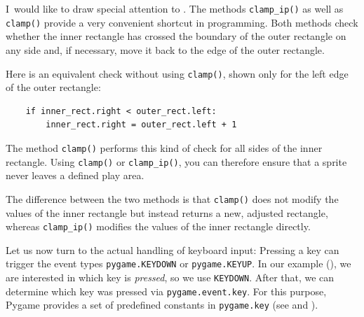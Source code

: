 I~would like to draw special attention to . The methods \texttt{clamp\_ip()} as well as \texttt{clamp()} provide a very convenient shortcut in programming. Both methods check whether the inner rectangle has crossed the boundary of the outer rectangle on any side and, if necessary, move it back to the edge of the outer rectangle.

Here is an equivalent check without using \texttt{clamp()}, shown only for the left edge of the outer rectangle:
\lstset{firstnumber=1}
\begin{lstlisting}
	if inner_rect.right < outer_rect.left:
		inner_rect.right = outer_rect.left + 1
\end{lstlisting}

The method \texttt{clamp()} performs this kind of check for all sides of the inner rectangle. Using \texttt{clamp()} or \texttt{clamp\_ip()}, you can therefore ensure that a sprite never leaves a defined play area.

The difference between the two methods is that \texttt{clamp()} does not modify the values of the inner rectangle but instead returns a new, adjusted rectangle, whereas \texttt{clamp\_ip()} modifies the values of the inner rectangle directly.


Let us now turn to the actual handling of keyboard input: Pressing a key can trigger the event types \texttt{pygame.KEYDOWN} or \texttt{pygame.KEYUP}. In our example (), we are interested in which key is \emph{pressed}, so we use \texttt{KEYDOWN}. After that, we can determine which key was pressed via \texttt{pygame.event.key}. For this purpose, Pygame provides a set of predefined constants in \texttt{pygame.key} (see  and ).



